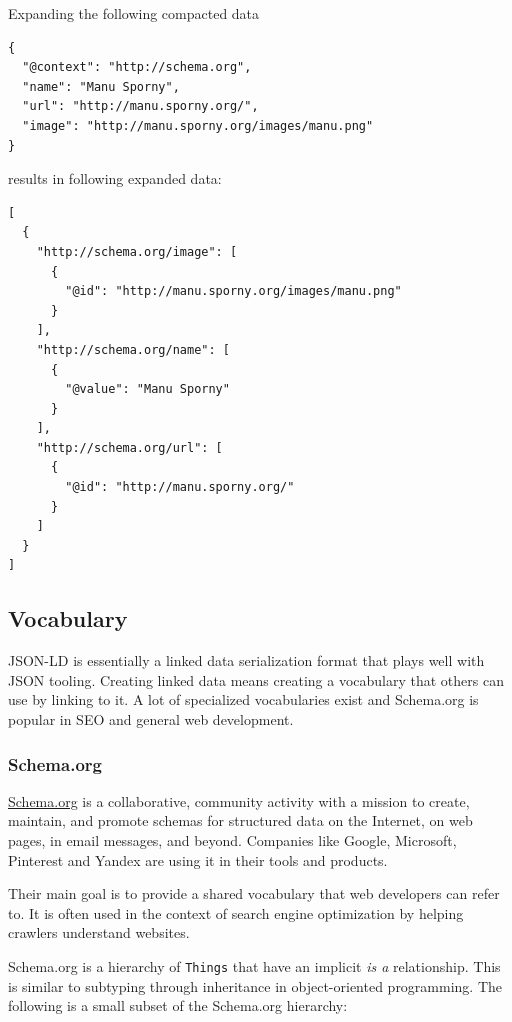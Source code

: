 Expanding the following compacted data

\lstset{language=JSON}
\begin{lstlisting}[caption=Compacted and easy-to-read data of a person]
{
  "@context": "http://schema.org",
  "name": "Manu Sporny",
  "url": "http://manu.sporny.org/",
  "image": "http://manu.sporny.org/images/manu.png"
}
\end{lstlisting}

results in following expanded data:

\lstset{language=JSON}
\begin{lstlisting}[caption=Expanded data of a person that is easy to process for machines]
[
  {
    "http://schema.org/image": [
      {
        "@id": "http://manu.sporny.org/images/manu.png"
      }
    ],
    "http://schema.org/name": [
      {
        "@value": "Manu Sporny"
      }
    ],
    "http://schema.org/url": [
      {
        "@id": "http://manu.sporny.org/"
      }
    ]
  }
]
\end{lstlisting}

\subsection{Vocabulary}
JSON-LD is essentially a linked data serialization format that plays well with JSON tooling. Creating linked data means creating a vocabulary that others can use by linking to it. A lot of specialized vocabularies exist and Schema.org is popular in SEO and general web development.

\subsubsection{Schema.org}
\url{Schema.org} is a collaborative, community activity with a mission to create, maintain, and promote schemas for structured data on the Internet, on web pages, in email messages, and beyond. \citep{welcomeschemaorg} Companies like Google, Microsoft, Pinterest and Yandex are using it in their tools and products.

Their main goal is to provide a shared vocabulary that web developers can refer to. It is often used in the context of search engine optimization by helping crawlers understand websites.

Schema.org is a hierarchy of \lstinline{Things} that have an implicit \textit{is a} relationship. This is similar to subtyping through inheritance in object-oriented programming. The following is a small subset of the Schema.org hierarchy:

